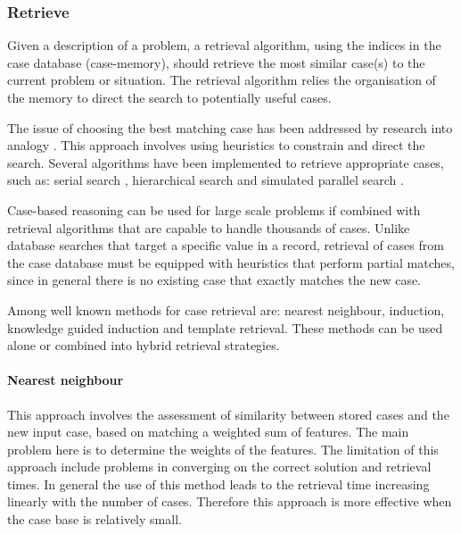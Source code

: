 \subsubsection{Retrieve}
\label{Retrieve} 
Given a description of a problem, a retrieval algorithm, using the indices in the case database (case-memory), 
should retrieve the most similar case(s) to the current problem or situation. The retrieval algorithm 
relies the organisation of the memory to direct the search to potentially useful cases.

The issue of choosing the best matching case has been addressed by research into analogy \cite{Falkenehainer_1986}. 
This approach involves using heuristics to constrain and direct the search. Several algorithms have 
been implemented to retrieve appropriate cases, such as: serial search 
\cite{Navinchandar_1991, Acorn_Walden_1992, Simoudis_93}, hierarchical search 
\cite{Maher_Zhang_1991} and simulated parallel search \cite{Domeshek_1993}.

Case-based reasoning can be used for large scale problems if combined with retrieval algorithms that are capable to handle thousands of cases. Unlike database searches that target a specific value in a record, retrieval of cases from the case database must be equipped with heuristics that perform partial matches, since in general there is no existing case that exactly matches the new case.

Among well known methods for case retrieval are: nearest neighbour, induction, 
knowledge guided induction and template retrieval. These methods can be used 
alone or combined into hybrid retrieval strategies.

\paragraph{Nearest neighbour}
\label{nearest neighbour}This approach involves the assessment of similarity 
between stored cases and the new input case, based on matching a weighted sum 
of features. The main problem here is to determine the weights of the features. 
The limitation of this approach include problems in converging on the 
correct solution and retrieval times. In general the use of this method leads 
to the retrieval time increasing linearly with the number of cases. Therefore 
this approach is more effective when the case base is relatively small. 

